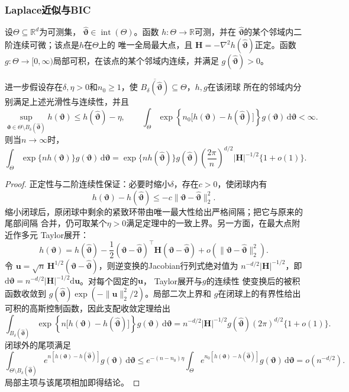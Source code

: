 \subsubsection{Laplace近似与BIC}

\begin{theorem}[固定维Laplace局部积分近似]
\label{thm:statistics-laplace-approximation}
设\(\Theta\subseteq\mathbb{R}^d\)为可测集，
\(\widehat{\bm\vartheta}\in\operatorname{int}(\Theta)\)。函数
\(h:\Theta\to\mathbb{R}\)可测，并在
\(\widehat{\bm\vartheta}\)的某个邻域内二阶连续可微；该点是\(h\)在\(\Theta\)上的
唯一全局最大点，且
\(\bm H=-\nabla^2h(\widehat{\bm\vartheta})\)正定。函数
\(g:\Theta\to[0,\infty)\)局部可积，在该点的某个邻域内连续，并满足
\(g(\widehat{\bm\vartheta})>0\)。

进一步假设存在\(\delta,\eta>0\)和\(n_0\geq1\)，使
\(\overline{B_\delta(\widehat{\bm\vartheta})}\subseteq\Theta\)，\(h,g\)在该闭球
所在的邻域内分别满足上述光滑性与连续性，并且
\[
  \sup_{\bm\vartheta\in
    \Theta\setminus B_\delta(\widehat{\bm\vartheta})}
  h(\bm\vartheta)
  \leq h(\widehat{\bm\vartheta})-\eta,
  \qquad
  \int_\Theta
  \exp\!\left\{n_0\bigl[h(\bm\vartheta)
    -h(\widehat{\bm\vartheta})\bigr]\right\}
  g(\bm\vartheta)\,\mathrm d\bm\vartheta<\infty.
\]
则当\(n\to\infty\)时，
\[
  \int_\Theta \exp\{n h(\bm\vartheta)\}g(\bm\vartheta)\,
  \mathrm d\bm\vartheta
  =
  \exp\{nh(\widehat{\bm\vartheta})\}
  g(\widehat{\bm\vartheta})
  \left(\frac{2\pi}{n}\right)^{d/2}
  |\bm H|^{-1/2}\{1+o(1)\}.
\]
\end{theorem}

\begin{proof}
正定性与二阶连续性保证：必要时缩小\(\delta\)，存在\(c>0\)，使闭球内有
\[
  h(\bm\vartheta)-h(\widehat{\bm\vartheta})
  \leq-c\lVert\bm\vartheta-\widehat{\bm\vartheta}\rVert_2^2.
\]
缩小闭球后，原闭球中剩余的紧致环带由唯一最大性给出严格间隔；把它与原来的尾部间隔
合并，仍可取某个\(\eta>0\)满足定理中的一致上界。另一方面，在最大点附近作多元
Taylor展开：
\[
  h(\bm\vartheta)
  =
  h(\widehat{\bm\vartheta})
  -\frac12(\bm\vartheta-\widehat{\bm\vartheta})^\top
  \bm H(\bm\vartheta-\widehat{\bm\vartheta})
  +o(\lVert\bm\vartheta-\widehat{\bm\vartheta}\rVert_2^2).
\]
令
\(\bm u=\sqrt n\,\bm H^{1/2}
(\bm\vartheta-\widehat{\bm\vartheta})\)，则逆变换的Jacobian行列式绝对值为
\(n^{-d/2}|\bm H|^{-1/2}\)，即
\(\mathrm d\bm\vartheta
=n^{-d/2}|\bm H|^{-1/2}\mathrm d\bm u\)。对每个固定的\(\bm u\)，
Taylor展开与\(g\)的连续性
使变换后的被积函数收敛到
\(g(\widehat{\bm\vartheta})\exp(-\lVert\bm u\rVert_2^2/2)\)。局部二次上界和
\(g\)在闭球上的有界性给出可积的高斯控制函数，因此支配收敛定理给出
\[
  \int_{B_\delta(\widehat{\bm\vartheta})}
  \exp\!\left\{n\bigl[h(\bm\vartheta)
    -h(\widehat{\bm\vartheta})\bigr]\right\}
  g(\bm\vartheta)\,\mathrm d\bm\vartheta
  =
  n^{-d/2}|\bm H|^{-1/2}
  g(\widehat{\bm\vartheta})(2\pi)^{d/2}\{1+o(1)\}.
\]
闭球外的尾项满足
\[
  \int_{\Theta\setminus B_\delta(\widehat{\bm\vartheta})}
  e^{n[h(\bm\vartheta)-h(\widehat{\bm\vartheta})]}
  g(\bm\vartheta)\,\mathrm d\bm\vartheta
  \leq
  e^{-(n-n_0)\eta}
  \int_\Theta
  e^{n_0[h(\bm\vartheta)-h(\widehat{\bm\vartheta})]}
  g(\bm\vartheta)\,\mathrm d\bm\vartheta
  =o(n^{-d/2}).
\]
局部主项与该尾项相加即得结论。
\end{proof}

